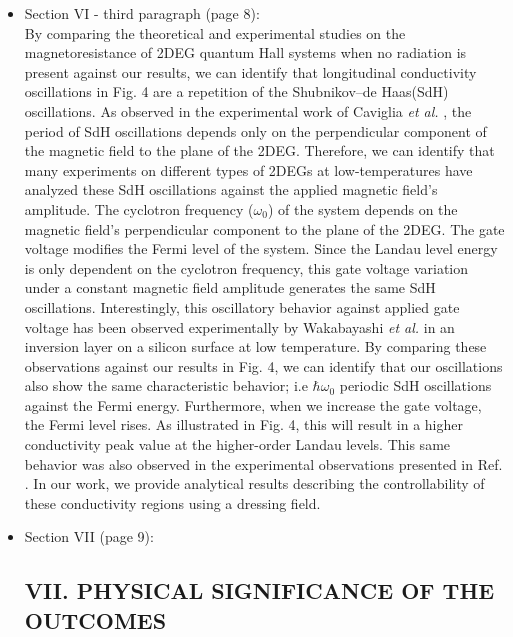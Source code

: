 \documentclass{article}
\begin{document}
\begin{itemize}
  \item Section VI - third paragraph (page 8):\\
  {\color{Red}
  By comparing the theoretical \cite{ando72,ando74_1,ando74_2,ando74_3,ando74_4,ando82,endo09} and experimental \cite{endo09,wakabayashi78,ochiai190,mancoff96,arapov02,grbic04,caviglia10} studies on the magnetoresistance of 2DEG quantum Hall systems when no radiation is present against our results, we can identify that longitudinal conductivity oscillations in Fig. 4 are a repetition of the Shubnikov–de Haas(SdH) oscillations.
  As observed in the experimental work of Caviglia \textit{et al.} \cite{caviglia10}, the period of SdH oscillations depends only on the perpendicular component of the magnetic field to the plane of the 2DEG.
  Therefore, we can identify that many experiments on different types of 2DEGs at low-temperatures \cite{endo09,ochiai190,mancoff96,arapov02,grbic04,caviglia10} have analyzed these SdH oscillations against the applied magnetic field's amplitude.
  The cyclotron frequency ($\omega_0$) of the system depends on the magnetic field's perpendicular component to the plane of the 2DEG.
  The gate voltage modifies the Fermi level of the system.
  Since the Landau level energy is only dependent on the cyclotron frequency, this gate voltage variation under a constant magnetic field amplitude generates the same SdH oscillations.
  Interestingly, this oscillatory behavior against applied gate voltage has been observed experimentally by Wakabayashi \textit{et al.} \cite{wakabayashi78} in an inversion layer on a silicon surface at low temperature.
  By comparing these observations against our results in Fig. 4, we can identify that our oscillations also show the same characteristic behavior; i.e  $\hbar\omega_0$ periodic SdH oscillations against the Fermi energy.
  Furthermore, when we increase the gate voltage, the Fermi level rises. As illustrated in Fig. 4, this will result in a higher conductivity peak value at the higher-order Landau levels. This same behavior was also observed in the experimental observations presented in Ref. \cite{wakabayashi78}.
  In our work, we provide analytical results describing the controllability of these conductivity regions using a dressing field.
  }
  \item Section VII (page 9):\\
  {\color{Red}
  \subsection*{VII. PHYSICAL SIGNIFICANCE OF THE OUTCOMES}

}
\end{itemize}
\end{document}

